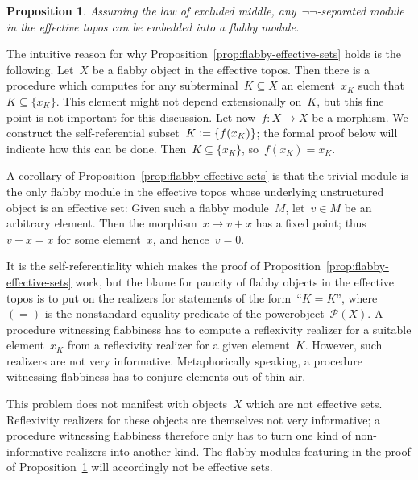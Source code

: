 \documentclass[oneside]{amsart}
\theoremstyle{definition}
\theoremstyle{plain}
\newtheorem{prop}[defn]{Proposition}
\theoremstyle{remark}
\renewcommand{\P}{\mathcal{P}}
\newcommand{\defeq}{\vcentcolon=}
\renewcommand{\_}{\mathpunct{.}\,}
\begin{document}
\begin{prop}\label{prop:semienough-flabby-modules}
Assuming the law of excluded middle, any~$\neg\neg$-separated
module in the effective topos can be embedded into a flabby module.
\end{prop}

The intuitive
reason for why Proposition~\ref{prop:flabby-effective-sets} holds is the
following. Let~$X$ be a flabby object in the effective topos. Then there is a
procedure which computes for any subterminal~$K \subseteq X$ an element~$x_K$
such that~$K \subseteq \{ x_K \}$. This element might not depend extensionally
on~$K$, but this fine point is not important for this discussion. Let
now~$f : X \to X$ be a morphism. We construct the self-referential subset~$K
\defeq \{ f(x_K) \}$; the formal proof below will indicate how this can be
done. Then~$K \subseteq \{ x_K \}$, so~$f(x_K) = x_K$.

A corollary of Proposition~\ref{prop:flabby-effective-sets} is that the trivial
module is the only flabby module in the effective topos whose underlying
unstructured object is an effective set: Given such a flabby module~$M$, let~$v
\in M$ be an arbitrary element. Then the morphism~$x \mapsto v + x$ has a fixed
point; thus~$v + x = x$ for some element~$x$, and hence~$v = 0$.

It is the self-referentiality which makes the proof of
Proposition~\ref{prop:flabby-effective-sets} work, but the blame for paucity
of flabby objects in the effective topos is to put on the realizers for
statements of the form~``$K = K$'', where~$({=})$ is the nonstandard equality
predicate of the powerobject~$\P(X)$. A procedure witnessing flabbiness has to
compute a reflexivity realizer for a suitable element~$x_K$ from a reflexivity
realizer for a given element~$K$. However, such realizers are not very
informative. Metaphorically speaking, a procedure witnessing flabbiness has to
conjure elements out of thin air.

This problem does not manifest with objects~$X$ which are not effective sets.
Reflexivity realizers for these objects are themselves not very informative;
a procedure witnessing flabbiness therefore only has to turn one kind of
non-informative realizers into another kind. The flabby modules featuring in
the proof of Proposition~\ref{prop:semienough-flabby-modules} will accordingly
not be effective sets.
\end{document}
